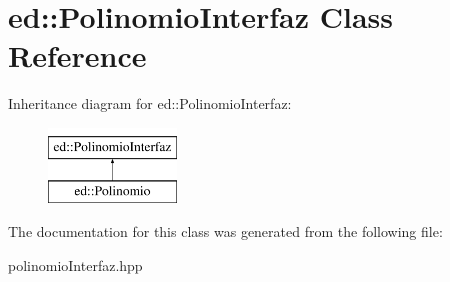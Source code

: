 \hypertarget{classed_1_1PolinomioInterfaz}{\section{ed\-:\-:Polinomio\-Interfaz Class Reference}
\label{classed_1_1PolinomioInterfaz}
}
Inheritance diagram for ed\-:\-:Polinomio\-Interfaz\-:\begin{figure}[H]
\begin{center}
\leavevmode
\includegraphics[height=2.000000cm]{classed_1_1PolinomioInterfaz}
\end{center}
\end{figure}


The documentation for this class was generated from the following file\-:\begin{DoxyCompactItemize}
\item 
polinomio\-Interfaz.\-hpp\end{DoxyCompactItemize}
